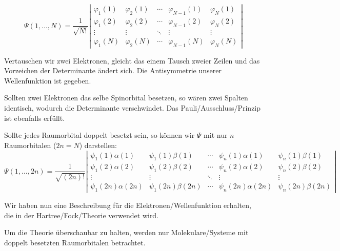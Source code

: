 \begin{equation}\label{slater}
\Psi(1, \dots, N) = 
\frac{1}{\sqrt{N!}}
\left\lvert
\begin{array}{ccccc} 
\varphi_1(1)  & \varphi_2(1)  & \cdots & \varphi_{N-1}(1)  & \varphi_N(1)\\ 
\varphi_1(2)  & \varphi_2(2)  & \cdots & \varphi_{N-1}(2)  & \varphi_N(2)\\ 
\vdots        & \vdots        & \ddots & \vdots            & \vdots      \\ 
\varphi_1(N)  & \varphi_2(N)  & \cdots & \varphi_{N-1}(N)  & \varphi_N(N)
\end{array}
\right\rvert
\end{equation}

Vertauschen wir zwei Elektronen, gleicht das einem Tausch zweier Zeilen
und das Vorzeichen der Determinante ändert sich.
Die Antisymmetrie unserer Wellenfunktion ist gegeben.

Sollten zwei Elektronen das selbe Spinorbital besetzen,
so wären zwei Spalten identisch, wodurch die Determinante verschwindet.
Das Pauli\-/Ausschluss\-/Prinzip ist ebenfalls erfüllt.

\cite[S. 50]{szabo_ostlund_1996}

Sollte jedes Raumorbital doppelt besetzt sein,
so können wir $\Psi$ mit nur $n$ Raumorbitalen ($2n = N$) darstellen:
\begin{equation}
\Psi(1, \dots, 2n) = 
\frac{1}{\sqrt{(2n)!}}
\left\lvert
\begin{array}{ccccc} 
\psi_1(1)\alpha(1) & \psi_1(1)\beta(1) & \cdots & \psi_n(1)\alpha(1) & \psi_n(1)\beta(1)\\ 
\psi_1(2)\alpha(2) & \psi_1(2)\beta(2) & \cdots & \psi_n(2)\alpha(2) & \psi_n(2)\beta(2)\\ 
    \vdots         &       \vdots      & \ddots &       \vdots       &       \vdots     \\ 
\psi_1(2n)\alpha(2n) & \psi_1(2n)\beta(2n) & \cdots & \psi_n(2n)\alpha(2n) & \psi_n(2n) \beta(2n)
\end{array}
\right\rvert
\end{equation}
\cite[S. 202]{lewars_2016}

Wir haben nun eine Beschreibung für die Elektronen\-/Wellenfunktion erhalten,
die in der Hartree\-/Fock\-/Theorie verwendet wird.

Um die Theorie überschaubar zu halten,
werden nur Molekulare\-/Systeme mit doppelt besetzten Raumorbitalen betrachtet.